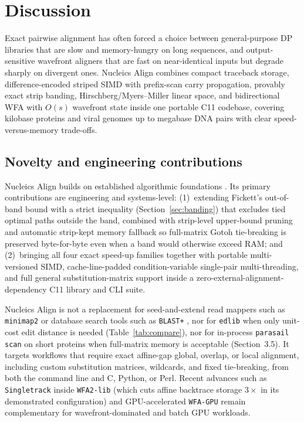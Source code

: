 \documentclass[11pt,a4paper]{article}
\begin{document}
\section{Discussion}

Exact pairwise alignment has often forced a choice between general-purpose DP libraries that are slow and memory-hungry on long sequences, and output-sensitive wavefront aligners that are fast on near-identical inputs but degrade sharply on divergent ones. Nucleics Align combines compact traceback storage, difference-encoded striped SIMD with prefix-scan carry propagation, provably exact strip banding, Hirschberg/Myers--Miller linear space, and bidirectional WFA with $O(s)$ wavefront state inside one portable C11 codebase, covering kilobase proteins and viral genomes up to megabase DNA pairs with clear speed-versus-memory trade-offs.

\subsection{Novelty and engineering contributions}

Nucleics Align builds on established algorithmic foundations \citep{gotoh1982improved,hirschberg1975linear,fickett1984fast,myers1988optimal,farrar2007striped,suzuki2018introducing,marcosola2021fast,marcosola2023optimal,myers1999fast,grootkoerkamp2024apa2}. Its primary contributions are engineering and systems-level: (1)~extending Fickett's out-of-band bound \citep{fickett1984fast} with a strict inequality (Section~\ref{sec:banding}) that excludes tied optimal paths outside the band, combined with strip-level upper-bound pruning and automatic strip-kept memory fallback so full-matrix Gotoh tie-breaking is preserved byte-for-byte even when a band would otherwise exceed RAM; and (2)~bringing all four exact speed-up families together with portable multi-versioned SIMD, cache-line-padded condition-variable single-pair multi-threading, and full general substitution-matrix support inside a zero-external-alignment-dependency C11 library and CLI suite.

Nucleics Align is not a replacement for seed-and-extend read mappers such as \texttt{minimap2} \citep{li2018minimap2} or database search tools such as \texttt{BLAST+} \citep{camacho2009blastplus}, nor for \texttt{edlib} \citep{sosic2017edlib} when only unit-cost edit distance is needed (Table~\ref{tab:compare}), nor for in-process \texttt{parasail} \texttt{scan} on short proteins when full-matrix memory is acceptable (Section~3.5). It targets workflows that require exact affine-gap global, overlap, or local alignment, including custom substitution matrices, wildcards, and fixed tie-breaking, from both the command line and C, Python, or Perl. Recent advances such as \texttt{Singletrack} \citep{lopezvillellas2026singletrack} inside \texttt{WFA2-lib} (which cuts affine backtrace storage $3\times$ in its demonstrated configuration) and GPU-accelerated \texttt{WFA-GPU} \citep{aguadopuig2023wfagpu} remain complementary for wavefront-dominated and batch GPU workloads.
\end{document}
